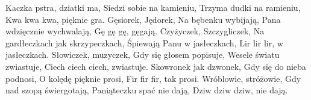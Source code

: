 \beginverse
Kaczka pstra, dziatki ma,
Siedzi sobie na kamieniu,
Trzyma dudki na ramieniu,
Kwa kwa kwa, pięknie gra.
\endverse
\beginverse
Gęsiorek, Jędorek,
Na bębenku wybijają,
Pana wdzięcznie wychwalają,
Gę gę gę, gęgają.
\endverse
\beginverse
Czyżyczek, Szczygliczek,
Na gardłeczkach jak skrzypeczkach,
Śpiewają Panu w jasłeczkach,
Lir lir lir, w jasłeczkach.
\endverse
\beginverse
Słowiczek, muzyczek,
Gdy się głosem popisuje,
Wesele światu zwiastuje,
Ciech ciech ciech, zwiastuje.
\endverse
\beginverse
Skowronek jak dzwonek,
Gdy się do nieba podnosi,
O kolędę pięknie prosi,
Fir fir fir, tak prosi.
\endverse
\beginverse
Wróblowie, stróżowie,
Gdy nad szopą świergotają,
Paniąteczku spać nie dają,
Dziw dziw dziw, nie dają.
\endverse
\endsong